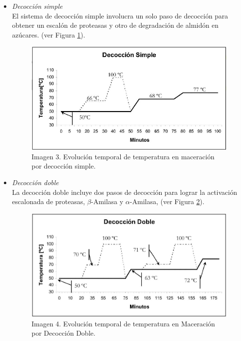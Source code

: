                 \begin{itemize}
                    \item \textit{Decocción simple} \\ El sistema de decocción simple involucra un solo paso de decocción para obtener un escalón de proteasas y otro de degradación de almidón en azúcares. (ver Figura \ref{MaceracionDecoccionSimple}).\hfill \break 
                    \hfill \break 
                    \begin{figure} [ht]                  \centerline{\includegraphics[scale=0.7]{decoccion_simple.jpg}}
                        \caption{Imagen 3. Evolución temporal de temperatura en maceración por decocción simple. \cite{Ceresvis}}
                        \label{MaceracionDecoccionSimple}
                    \end{figure}
                    
                    \item \textit{Decocción doble} \\ La decocción doble incluye dos pasos de decocción para lograr la activación escalonada de proteasas, $\beta$-Amilasa y $\alpha$-Amilasa, (ver Figura \ref{MaceracionDecoccionDoble}).
                    
                    \begin{figure} [ht]		                                                            \centerline{\includegraphics[scale=0.5]{decoccion_doble.jpg}}
                        \caption{Imagen 4. Evolución temporal de temperatura en Maceración por Decocción Doble. \cite{Ceresvis}}
                        \label{MaceracionDecoccionDoble}
                    \end{figure}
                    

\end{itemize}
